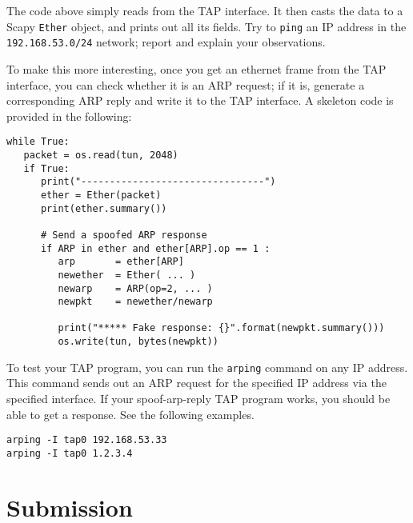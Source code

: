 The code above simply reads from the TAP interface. It then casts 
the data to a Scapy \texttt{Ether} object, and prints out all 
its fields. Try to \texttt{ping} an IP address in
the \texttt{192.168.53.0/24} network; report and explain your observations.  

To make this more interesting, once you get an ethernet frame from the TAP interface,
you can check whether it is an ARP request; if it is, generate a corresponding
ARP reply and write it to the TAP interface. A skeleton code is provided in the
following:

\begin{lstlisting}
while True:
   packet = os.read(tun, 2048)
   if True:
      print("--------------------------------")
      ether = Ether(packet)
      print(ether.summary())

      # Send a spoofed ARP response
      if ARP in ether and ether[ARP].op == 1 :
         arp       = ether[ARP]
         newether  = Ether( ... )
         newarp    = ARP(op=2, ... )
         newpkt    = newether/newarp

         print("***** Fake response: {}".format(newpkt.summary()))
         os.write(tun, bytes(newpkt))
\end{lstlisting}

To test your TAP program, you can run the \texttt{arping} command
on any IP address.  This command sends out an ARP request for the specified IP address 
via the specified interface. 
If your spoof-arp-reply TAP program works, you should be able to get a 
response. See the following examples. 

\begin{lstlisting}
arping -I tap0 192.168.53.33
arping -I tap0 1.2.3.4
\end{lstlisting}
 
 
\section{Submission}

\seedsubmission









